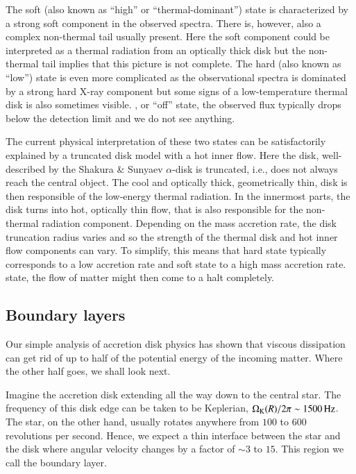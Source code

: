The soft (also known as ``high'' or ``thermal-dominant'') state is characterized by a strong soft component in the observed spectra.\cite[see e.g.,][]{GZP99}
There is, however, also a complex non-thermal tail usually present.\cite{MRC00}
Here the soft component could be interpreted as a thermal radiation from an optically thick disk but the non-thermal tail implies that this picture is not complete.
The hard (also known as ``low'') state is even more complicated as the observational spectra is dominated by a strong hard X-ray component but some signs of a low-temperature thermal disk is also sometimes visible.\cite{ZG04}
, or ``off'' state, the observed flux typically drops below the detection limit and we do not see anything.


The current physical interpretation of these two states can be satisfactorily explained by a truncated disk model with a hot inner flow.
Here the disk, well-described by the Shakura \& Sunyaev $\alpha$-disk is truncated, i.e., does not always reach the central object.
The cool and optically thick, geometrically thin, disk is then responsible of the low-energy thermal radiation.
In the innermost parts, the disk turns into hot, optically thin flow, that is also responsible for the non-thermal radiation component.
Depending on the mass accretion rate, the disk truncation radius varies and so the strength of the thermal disk and hot inner flow components can vary.
To simplify, this means that hard state typically corresponds to a low accretion rate and soft state to a high mass accretion rate.
 state, the flow of matter might then come to a halt completely.


\subsection{Boundary layers}

Our simple analysis of accretion disk physics has shown that viscous dissipation can get rid of up to half of the potential energy of the incoming matter.
Where the other half goes, we shall look next.

Imagine the accretion disk extending all the way down to the central star.
The  frequency of this disk edge can be taken to be Keplerian, $\Omega_{\mathrm{K}}(R)/2\pi \sim 1500 \,\mathrm{Hz}$.
The star, on the other hand, usually rotates anywhere from $100$ to $600$ revolutions per second.\cite{Watts12, PTR14}
Hence, we expect a thin interface between the star and the disk where angular velocity changes by a factor of $\sim 3$ to $15$.
This region we call the boundary layer.

